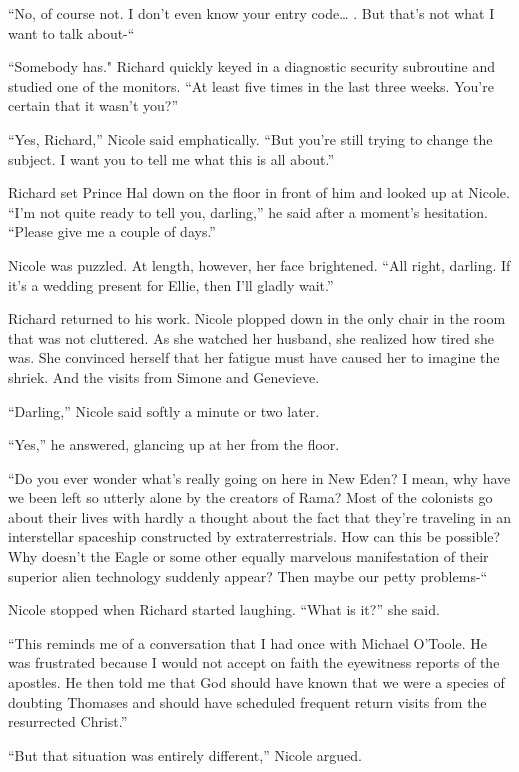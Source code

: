 \documentclass[]{article}
\begin{document}
{“No, of course not.  I don’t even know your entry code… .  But that’s not what I want to talk about-“

“Somebody has."  Richard quickly keyed in a diagnostic security subroutine and studied one of the monitors.  “At least five times in the last three weeks.  You’re certain that it wasn’t you?”

“Yes, Richard,” Nicole said emphatically.  “But you’re still trying to change the subject.  I want you to tell me what this is all about.”

Richard set Prince Hal down on the floor in front of him and looked up at Nicole.  “I’m not quite ready to tell you, darling,” he said after a moment’s hesitation.  “Please give me a couple of days.”

Nicole was puzzled.  At length, however, her face brightened.  “All right, darling.  If it’s a wedding present for Ellie, then I’ll gladly wait.”

Richard returned to his work.  Nicole plopped down in the only chair in the room that was not cluttered.  As she watched her husband, she realized how tired she was.  She convinced herself that her fatigue must have caused her to imagine the shriek.  And the visits from Simone and Genevieve.

“Darling,” Nicole said softly a minute or two later.

“Yes,” he answered, glancing up at her from the floor.

“Do you ever wonder what’s really going on here in New Eden? I mean, why have we been left so utterly alone by the creators of Rama? Most of the colonists go about their lives with hardly a thought about the fact that they’re traveling in an interstellar spaceship constructed by extraterrestrials.  How can this be possible? Why doesn’t the Eagle or some other equally marvelous manifestation of their superior alien technology suddenly appear? Then maybe our petty problems-“

Nicole stopped when Richard started laughing.  “What is it?” she said.

“This reminds me of a conversation that I had once with Michael O’Toole.  He was frustrated because I would not accept on faith the eyewitness reports of the apostles.  He then told me that God should have known that we were a species of doubting Thomases and should have scheduled frequent return visits from the resurrected Christ.”

“But that situation was entirely different,” Nicole argued.

}
\end{document}
